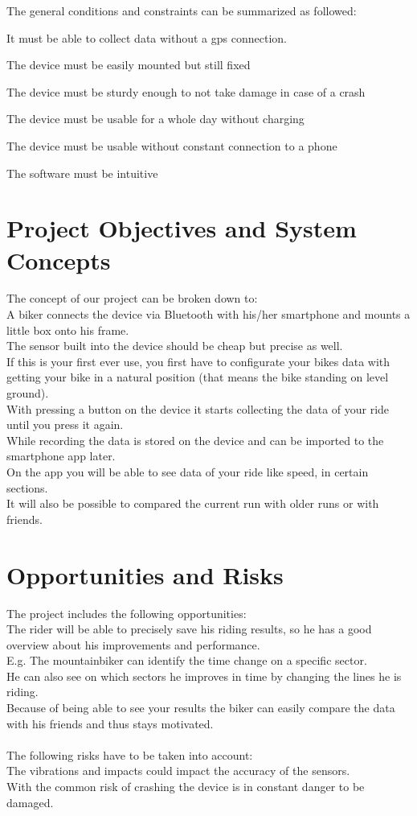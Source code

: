 \documentclass[12pt]{article}
\theoremstyle{definition}
\begin{document}
The general conditions and constraints can be summarized as followed:

It must be able to collect data without a gps connection.

The device must be easily mounted but still fixed

The device must be sturdy enough to not take damage in case of a crash

The device must be usable for a whole day without charging

The device must be usable without constant connection to a phone

The software must be intuitive

\pagebreak

\section{Project Objectives and System Concepts}
The concept of our project can be broken down to:\\
A biker connects the device via Bluetooth with his/her smartphone and mounts a little box onto his frame.\\
The sensor built into the device should be cheap but precise as well.\\
If this is your first ever use, you first have to configurate your bikes data with getting your bike in a natural position (that means the bike standing on level ground).\\
With pressing a button on the device it starts collecting the data of your ride until you press it again.\\ 
While recording the data is stored on the device and can be imported to the smartphone app later.\\
On the app you will be able to see data of your ride like speed, in certain sections.\\
It will also be possible to compared the current run with older runs or with friends.

\pagebreak
\section{Opportunities and Risks}
The project includes the following opportunities:\\
The rider will be able to precisely save his riding results, so he has a good overview about his improvements and performance.\\
E.g. The mountainbiker can identify the time change on a specific sector.\\
He can also see on which sectors he improves in time by changing the lines he is riding.\\
Because of being able to see your results the biker can easily compare the data with his friends and thus stays motivated.\\\\
The following risks have to be taken into account:\\
The vibrations and impacts could impact the accuracy of the sensors.\\
With the common risk of crashing the device is in constant danger to be damaged.
\end{document}

